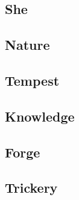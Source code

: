 

\subsection{She}


\subsection{Nature}


\subsection{Tempest}


\subsection{Knowledge}


\subsection{Forge}


\subsection{Trickery}

